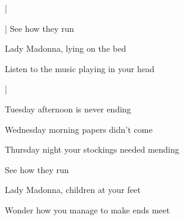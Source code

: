 \begin{song}
\bigskip

  |   \par
{}  | See how they run \par

\bigskip

Lady Madonna, lying on the bed \par
{}Listen to the music playing in your head \par

\bigskip

    |      \par

\bigskip

Tuesday afternoon is never ending \par
{}Wednesday morning papers didn't come \par
{}Thursday night your stockings needed mending \par
{}See how they run \par

\bigskip

Lady Madonna, children at your feet \par
{}Wonder how you manage to make ends meet \par



\end{song}

